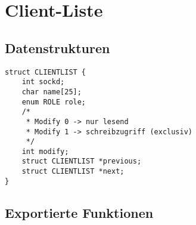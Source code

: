 \section{Client-Liste}

\subsection{Datenstrukturen}
\begin{lstlisting}
struct CLIENTLIST {
    int sockd;
    char name[25];
    enum ROLE role;
    /*
     * Modify 0 -> nur lesend
     * Modify 1 -> schreibzugriff (exclusiv)
     */
    int modify;
    struct CLIENTLIST *previous;
    struct CLIENTLIST *next;
}
\end{lstlisting}

\subsection{Exportierte Funktionen}